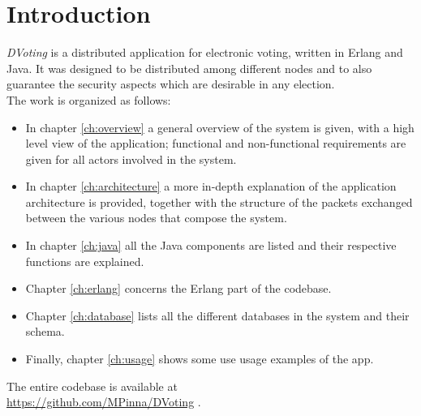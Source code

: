 %
\chapter{Introduction}
\textit{DVoting} is a distributed application for electronic voting, written in Erlang and Java. It was designed to be distributed among different nodes and to also guarantee the security aspects which are desirable in any election.\\
The work is organized as follows:
\begin{itemize}
	\item In chapter \ref{ch:overview} a general overview of the system is given, with a high level view of the application; functional and non-functional requirements are given for all actors involved in the system.
	\item In chapter \ref{ch:architecture} a more in-depth explanation of the application architecture is provided, together with the structure of the packets exchanged between the various nodes that compose the system.
	\item In chapter \ref{ch:java} all the Java components are listed and their respective functions are explained.
	\item Chapter \ref{ch:erlang} concerns the Erlang part of the codebase.
	\item Chapter \ref{ch:database} lists all the different databases in the system and their schema.
	\item Finally, chapter \ref{ch:usage} shows some use usage examples of the app.
\end{itemize}

\hfill \break
The entire codebase is available at\\
\url{https://github.com/MPinna/DVoting} .